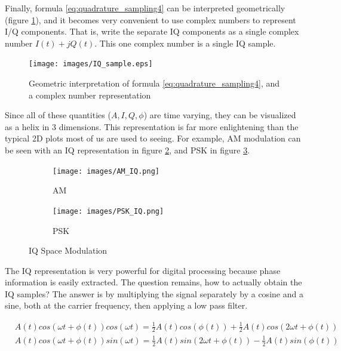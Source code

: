\documentclass[a4paper, 12pt, notitlepage]{article}
\begin{document}
Finally, formula \ref{eq:quadrature_sampling4} can be interpreted geometrically (figure \ref{fig:quadrature_sampling}), and it becomes very convenient to use complex numbers to represent I/Q components.  That is, write the separate IQ components as a single complex number $I(t) + jQ(t)$.  This one complex number is a single IQ sample.

\begin{figure}[ht]
\caption{Geometric interpretation of formula \ref{eq:quadrature_sampling4}, and a complex number representation}
\label{fig:quadrature_sampling}
\centering
\texttt{[image: images/IQ\_sample.eps]}
\end{figure}

Since all of these quantities ($A, I, Q, \phi$) are time varying, they can be visualized as a helix in 3 dimensions.  This representation is far more enlightening than the typical 2D plots most of us are used to seeing.  For example, AM modulation can be seen with an IQ representation in figure \ref{fig:am_iq}, and PSK in figure \ref{fig:psk_iq}.

\begin{figure}
\begin{subfigure}[b]{0.45\textwidth}
  \centering
  \caption{AM} 
  \label{fig:am_iq}
  \texttt{[image: images/AM\_IQ.png]}
\end{subfigure}
\begin{subfigure}[b]{0.45\textwidth}
  \centering
  \caption{PSK}
  \label{fig:psk_iq}
  \texttt{[image: images/PSK\_IQ.png]}
\end{subfigure}

\caption{IQ Space Modulation}
\label{fig:iq_mod}
\end{figure}

The IQ representation is very powerful for digital processing because phase information is easily extracted.  The question remains, how to actually obtain the IQ samples?  The answer is by multiplying the signal separately by a cosine and a sine, both at the carrier frequency, then applying a low pass filter.

\begin{equation*}
\label{eq:quadrature_sampling5}
\begin{aligned}
  &A(t)cos(\omega t + \phi(t))cos(\omega t) = \frac{1}{2}A(t)cos(\phi(t)) + \frac{1}{2}A(t)cos(2\omega t + \phi (t))\\
  &A(t)cos(\omega t + \phi(t))sin(\omega t) = \frac{1}{2}A(t)sin(2\omega t + \phi(t)) - \frac{1}{2}A(t)sin(\phi(t))
\end{aligned}
\end{equation*}
\end{document}
